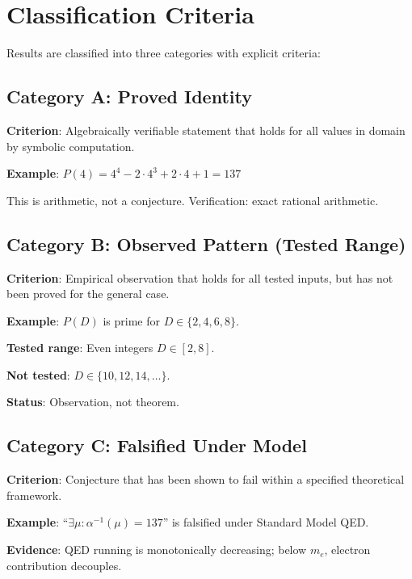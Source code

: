 \documentclass[11pt,a4paper]{article}
\begin{document}
\section{Classification Criteria}

Results are classified into three categories with explicit criteria:

\subsection{Category A: Proved Identity}

\textbf{Criterion}: Algebraically verifiable statement that holds for all values in domain by symbolic computation.

\textbf{Example}: $P(4) = 4^4 - 2 \cdot 4^3 + 2 \cdot 4 + 1 = 137$

This is arithmetic, not a conjecture. Verification: exact rational arithmetic.

\subsection{Category B: Observed Pattern (Tested Range)}

\textbf{Criterion}: Empirical observation that holds for all tested inputs, but has not been proved for the general case.

\textbf{Example}: $P(D)$ is prime for $D \in \{2, 4, 6, 8\}$.

\textbf{Tested range}: Even integers $D \in [2, 8]$.

\textbf{Not tested}: $D \in \{10, 12, 14, \ldots\}$.

\textbf{Status}: Observation, not theorem.

\subsection{Category C: Falsified Under Model}

\textbf{Criterion}: Conjecture that has been shown to fail within a specified theoretical framework.

\textbf{Example}: ``$\exists \mu: \alpha^{-1}(\mu) = 137$'' is falsified under Standard Model QED.

\textbf{Evidence}: QED running is monotonically decreasing; below $m_e$, electron contribution decouples.
\end{document}
